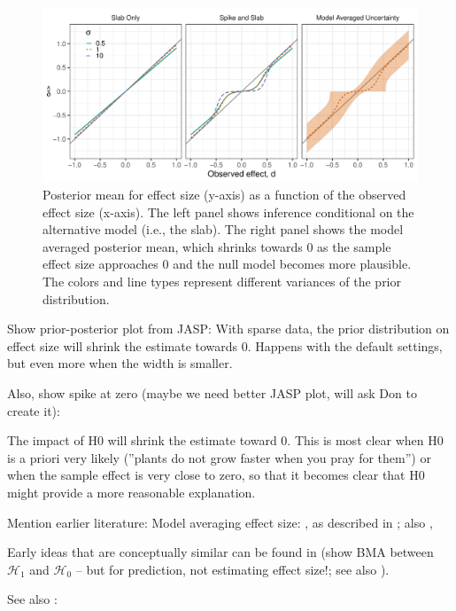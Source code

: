 \documentclass[a4paper]{article}
\begin{document}
\begin{figure}[!ht]
	\includegraphics[width=\textwidth]{posteriorMeanVsSampleDelta3panel.pdf}
	\caption{Posterior mean for effect size (y-axis) as a function of the observed effect size (x-axis). The left panel shows inference conditional on the alternative model (i.e., the slab). The right panel shows the model averaged posterior mean, which shrinks towards 0 as the sample effect size approaches 0 and the null model becomes more plausible. The colors and line types represent different variances of the prior distribution.}
	\label{fig:posteriorMeanVsSampleDelta}
\end{figure}


Show prior-posterior plot from JASP:
With sparse data, the prior distribution on effect size will shrink the estimate towards 0. Happens with the default settings, but even more when the width is smaller.

Also, show spike at zero (maybe we need better JASP plot, will ask Don to create it):

The impact of H0 will shrink the estimate toward 0. This is most clear when H0 is a priori very likely (''plants do not grow faster when you pray for them'') or when the sample effect is very close to zero, so that it becomes clear that H0 might provide a more reasonable explanation.

Mention earlier literature:
Model averaging effect size:
\cite[pp. 640-641]{ZellnerVandaele1975}, as described in \cite[p. 600-601]{ZellnerSiow1980}; also \cite[p. 57]{Haldane1932}, \cite{IversonEtAl2010}

Early ideas that are conceptually similar can be found in \cite[p. 387]{WrinchJeffreys1921} (show BMA between $\mathcal{H}_1$ and $\mathcal{H}_0$ -- but for prediction, not estimating effect size!; see also \cite{Jevons18741913}).

See also \cite{RouderEtAl2018PBR}:
\end{document}
